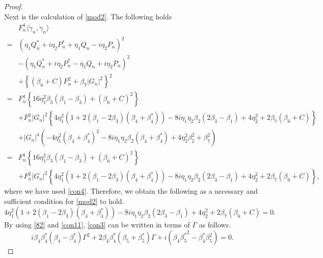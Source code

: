\documentclass[10pt,leqno]{amsart}
\numberwithin{equation}{section}
\begin{document}
\begin{proof}
\begin{equation}
\end{equation}
Next is the calculation of \eqref{mod2}. The following holds
\begin{equation}\label{eqn:rhopm}
\begin{split}
&F_{n}^{4}\langle\dot{\gamma}_{n}, \dot{\gamma}_{n}\rangle\\
=&\left(\eta_{1}Q_{n}^{*}+i\eta_{2}P_{n}^{*}+\eta_{1}Q_{n}-i\eta_{2}P_{n}\right)^{2}\\
&-\left(\eta_{1}Q_{n}^{*}+i\eta_{2}P_{n}^{*}-\eta_{1}Q_{n}+i\eta_{2}P_{n}\right)^{2}\\
&+\left\{\left(\beta_{6}+C\right)F_{n}^{2}+\beta_{7}|G_{n}|^{2}\right\}^{2}\\
=&F_{n}^{4}\left\{16\eta_{1}^{2}\beta_{3}\left(\beta_{1}-\beta_{3}\right)+\left(\beta_{6}+C\right)^{2}\right\}\\
&+F_{n}^{2}|G_{n}|^{2}\left\{4\eta_{1}^{2}\left(1+2\left(\beta_{1}-2\beta_{3}\right)\left(\beta_{4}+\beta_{4}^{*}\right)\right)-8i\eta_{1}\eta_{2}\beta_{2}\left(2\beta_{3}-\beta_{1}\right)+4\eta_{2}^{2}+2\beta_{7}\left(\beta_{6}+C\right)\right\}\\
&+|G_{n}|^{4}\left(-4\eta_{1}^{2}\left(\beta_{4}+\beta_{4}^{*}\right)^{2}-8i\eta_{1}\eta_{2}\beta_{2}\left(\beta_{4}+\beta_{4}^{*}\right)+4\eta_{2}^{2}\beta_{2}^{2}+\beta_{7}^{2}\right)\\
=&F_{n}^{4}\left\{16\eta_{1}^{2}\beta_{3}\left(\beta_{1}-\beta_{3}\right)+\left(\beta_{6}+C\right)^{2}\right\}\\
&+F_{n}^{2}|G_{n}|^{2}\left\{4\eta_{1}^{2}\left(1+2\left(\beta_{1}-2\beta_{3}\right)\left(\beta_{4}+\beta_{4}^{*}\right)\right)-8i\eta_{1}\eta_{2}\beta_{2}\left(2\beta_{3}-\beta_{1}\right)+4\eta_{2}^{2}+2\beta_{7}\left(\beta_{6}+C\right)\right\},
\end{split}
\end{equation}
where we have used \eqref{con4}.
Therefore, we obtain the following as a necessary and sufficient condition for \eqref{mod2} to hold.
\begin{equation}\label{con3}
4\eta_{1}^{2}\left(1+2\left(\beta_{1}-2\beta_{3}\right)\left(\beta_{4}+\beta_{4}^{*}\right)\right)-8i\eta_{1}\eta_{2}\beta_{2}\left(2\beta_{3}-\beta_{1}\right)+4\eta_{2}^{2}+2\beta_{7}\left(\beta_{6}+C\right)=0.
\end{equation}
By using \eqref{82} and \eqref{con11}, \eqref{con3} can be written in terms of $\Gamma$ as follows.
\begin{equation}\label{con31}
i\beta_{4}\beta_{4}^{*}\left(\beta_{4}-\beta_{4}^{*}\right)\Gamma^{2}+2\beta_{4}\beta_{4}^{*}\left(\beta_{5}+\beta_{5}^{*}\right)\Gamma+i\left(\beta_{4}{\beta_{5}^{*}}^{2}-\beta_{4}^{*}\beta_{5}^{2}\right)=0.

\end{equation}
\end{proof}
\end{document}
